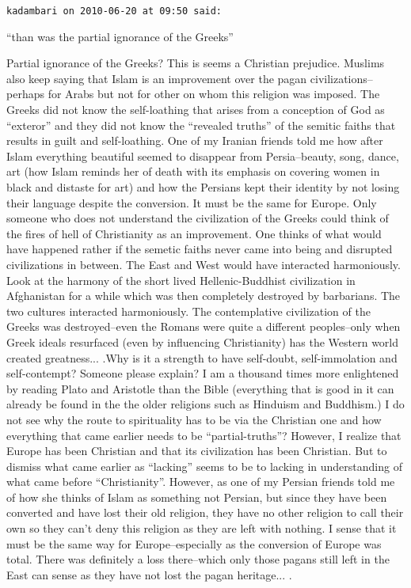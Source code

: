 \begin{footnotesize}
\begin{sffamily}
\texttt{kadambari on 2010-06-20 at 09:50 said:}

``than was the partial ignorance of the Greeks''

Partial ignorance of the Greeks? This is seems a Christian prejudice. Muslims also keep saying that Islam is an improvement over the pagan civilizations--perhaps for Arabs but not for other on whom this religion was imposed. The Greeks did not know the self-loathing that arises from a conception of God as ``exteror'' and they did not know the ``revealed truths'' of the semitic faiths that results in guilt and self-loathing. One of my Iranian friends told me how after Islam everything beautiful seemed to disappear from Persia--beauty, song, dance, art (how Islam reminds her of death with its emphasis on covering women in black and distaste for art) and how the Persians kept their identity by not losing their language despite the conversion. It must be the same for Europe. Only someone who does not understand the civilization of the Greeks could think of the fires of hell of Christianity as an improvement. One thinks of what would have happened rather if the semetic faiths never came into being and disrupted civilizations in between. The East and West would have interacted harmoniously. Look at the harmony of the short lived Hellenic-Buddhist civilization in Afghanistan for a while which was then completely destroyed by barbarians. The two cultures interacted harmoniously. The contemplative civilization of the Greeks was destroyed--even the Romans were quite a different peoples--only when Greek ideals resurfaced (even by influencing Christianity) has the Western world created greatness... .Why is it a strength to have self-doubt, self-immolation and self-contempt? Someone please explain? I am a thousand times more enlightened by reading Plato and Aristotle than the Bible (everything that is good in it can already be found in the the older religions such as Hinduism and Buddhism.) I do not see why the route to spirituality has to be via the Christian one and how everything that came earlier needs to be ``partial-truths''? However, I realize that Europe has been Christian and that its civilization has been Christian. But to dismiss what came earlier as ``lacking'' seems to be to lacking in understanding of what came before ``Christianity''. However, as one of my Persian friends told me of how she thinks of Islam as something not Persian, but since they have been converted and have lost their old religion, they have no other religion to call their own so they can't deny this religion as they are left with nothing. I sense that it must be the same way for Europe--especially as the conversion of Europe was total. There was definitely a loss there--which only those pagans still left in the East can sense as they have not lost the pagan heritage... .


\end{sffamily}
\end{footnotesize}
